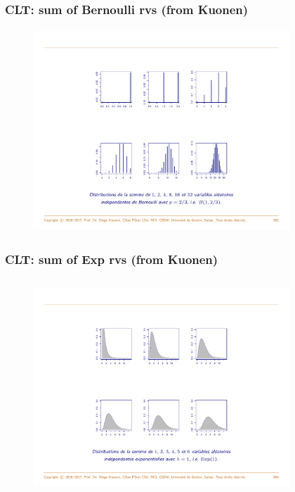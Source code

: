 \documentclass[notes=show,smaller,handout]{beamer}\usepackage[]{graphicx}\usepackage[]{color}
\begin{document}
\begin{frame}%
\frametitle{CLT: sum of Bernoulli rvs (from Kuonen)}
\begin{figure}[ptb]\centering
\includegraphics[height=3in, width=3.8in]{img/Bernoulli.pdf}%
\end{figure}%
\end{frame}%


\begin{frame}%
\frametitle{CLT: sum of Exp rvs (from Kuonen)}

\begin{figure}[ptb]\centering
\includegraphics[height=3.2in, width=3.8in]{img/Exp.pdf}%
\end{figure}%
\end{frame}%
\end{document}
